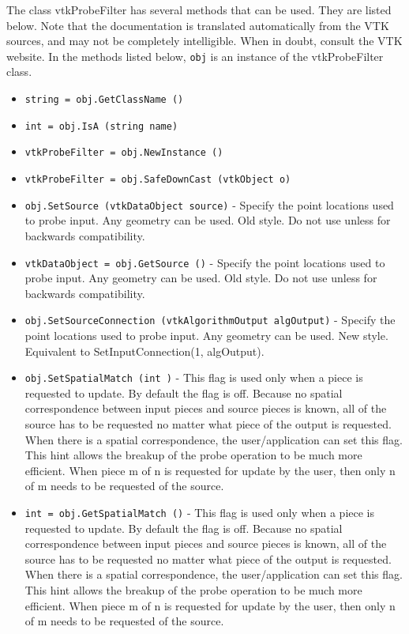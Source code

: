The class vtkProbeFilter has several methods that can be used.
  They are listed below.
Note that the documentation is translated automatically from the VTK sources,
and may not be completely intelligible.  When in doubt, consult the VTK website.
In the methods listed below, \verb|obj| is an instance of the vtkProbeFilter class.
\begin{itemize}
\item  \verb|string = obj.GetClassName ()|

\item  \verb|int = obj.IsA (string name)|

\item  \verb|vtkProbeFilter = obj.NewInstance ()|

\item  \verb|vtkProbeFilter = obj.SafeDownCast (vtkObject o)|

\item  \verb|obj.SetSource (vtkDataObject source)| -  Specify the point locations used to probe input. Any geometry
 can be used. Old style. Do not use unless for backwards compatibility.

\item  \verb|vtkDataObject = obj.GetSource ()| -  Specify the point locations used to probe input. Any geometry
 can be used. Old style. Do not use unless for backwards compatibility.

\item  \verb|obj.SetSourceConnection (vtkAlgorithmOutput algOutput)| -  Specify the point locations used to probe input. Any geometry
 can be used. New style. Equivalent to SetInputConnection(1, algOutput).

\item  \verb|obj.SetSpatialMatch (int )| -  This flag is used only when a piece is requested to update.  By default
 the flag is off.  Because no spatial correspondence between input pieces
 and source pieces is known, all of the source has to be requested no
 matter what piece of the output is requested.  When there is a spatial 
 correspondence, the user/application can set this flag.  This hint allows
 the breakup of the probe operation to be much more efficient.  When piece
 m of n is requested for update by the user, then only n of m needs to
 be requested of the source. 

\item  \verb|int = obj.GetSpatialMatch ()| -  This flag is used only when a piece is requested to update.  By default
 the flag is off.  Because no spatial correspondence between input pieces
 and source pieces is known, all of the source has to be requested no
 matter what piece of the output is requested.  When there is a spatial 
 correspondence, the user/application can set this flag.  This hint allows
 the breakup of the probe operation to be much more efficient.  When piece
 m of n is requested for update by the user, then only n of m needs to
 be requested of the source. 


\end{itemize}
